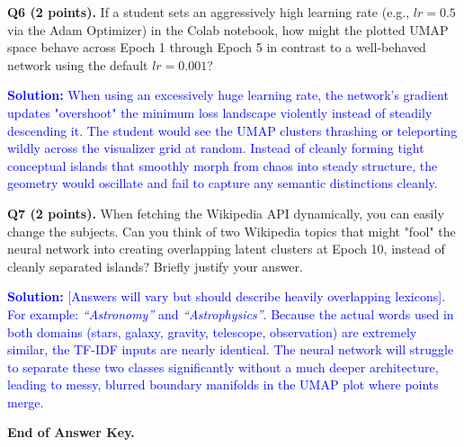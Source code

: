\documentclass[11pt]{article}
\begin{document}
\textbf{Q6 (2 points).} If a student sets an aggressively high learning rate (e.g., $lr=0.5$ via the Adam Optimizer) in the Colab notebook, how might the plotted UMAP space behave across Epoch 1 through Epoch 5 in contrast to a well-behaved network using the default $lr=0.001$? 

\textcolor{blue}{\textbf{Solution:} When using an excessively huge learning rate, the network's gradient updates "overshoot" the minimum loss landscape violently instead of steadily descending it. The student would see the UMAP clusters thrashing or teleporting wildly across the visualizer grid at random. Instead of cleanly forming tight conceptual islands that smoothly morph from chaos into steady structure, the geometry would oscillate and fail to capture any semantic distinctions cleanly.}
\vspace{0.75cm}

\textbf{Q7 (2 points).} When fetching the Wikipedia API dynamically, you can easily change the subjects. Can you think of two Wikipedia topics that might "fool" the neural network into creating overlapping latent clusters at Epoch 10, instead of cleanly separated islands? Briefly justify your answer.

\textcolor{blue}{\textbf{Solution:} [Answers will vary but should describe heavily overlapping lexicons]. For example: \textit{``Astronomy''} and \textit{``Astrophysics''}. Because the actual words used in both domains (stars, galaxy, gravity, telescope, observation) are extremely similar, the TF-IDF inputs are nearly identical. The neural network will struggle to separate these two classes significantly without a much deeper architecture, leading to messy, blurred boundary manifolds in the UMAP plot where points merge.}
\vspace{0.75cm}

\begin{center}
\textbf{End of Answer Key.} 
\end{center}
\end{document}
